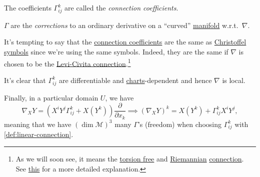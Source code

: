 \begin{notation}\label{not:connection-coefficient}
	The coefficients \(\Gamma ^k_{ij}\) are called the \emph{connection coefficients}.
\end{notation}

\begin{intuition}
	\(\Gamma \) are the \emph{corrections} to an ordinary derivative on a ``curved'' \hyperref[def:smooth-manifold]{manifold} w.r.t.\ \(\nabla \).
\end{intuition}

It's tempting to say that the \hyperref[not:connection-coefficient]{connection coefficients} are the same as \hyperref[not:Christoffel-symbol]{Christoffel symbols} since we're using the same symbols. Indeed, they are the same if \(\nabla \) is chosen to be the \hyperref[def:Levi-Civita-connection]{Levi-Civita connection}.\footnote{As we will soon see, it means the \hyperref[def:torsion-free]{torsion free} and \hyperref[def:Riemannian]{Riemannian} \hyperref[def:linear-connection]{connection}. See \href{https://profoundphysics.com/christoffel-symbols-a-complete-guide-with-examples/?utm_content=ezff}{this} for a more detailed explanation.}

\begin{note}
	It's clear that \(\Gamma ^k_{ij}\) are differentiable and \hyperref[def:coordinate-chart]{charts}-dependent and hence \(\nabla \) is local.
\end{note}

Finally, in a particular domain \(U\), we have
\[
	\nabla _X Y = \left( X^i Y^j \Gamma ^k_{ij} + X(Y^k) \right) \frac{\partial }{\partial x_k}
	\implies (\nabla _X Y)^k = X(Y^k) + \Gamma ^k_{ij} X^i Y^j,
\]
meaning that we have \((\dim \mathcal{M} )^3\) many \(\Gamma\)'s (freedom) when choosing \(\Gamma ^k_{ij}\) with \autoref{def:linear-connection}.

